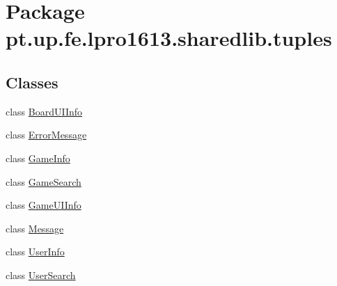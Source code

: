 \hypertarget{namespacept_1_1up_1_1fe_1_1lpro1613_1_1sharedlib_1_1tuples}{}\section{Package pt.\+up.\+fe.\+lpro1613.\+sharedlib.\+tuples}
\label{namespacept_1_1up_1_1fe_1_1lpro1613_1_1sharedlib_1_1tuples}
\subsection*{Classes}
\begin{DoxyCompactItemize}
\item 
class \hyperlink{classpt_1_1up_1_1fe_1_1lpro1613_1_1sharedlib_1_1tuples_1_1_board_u_i_info}{Board\+U\+I\+Info}
\item 
class \hyperlink{classpt_1_1up_1_1fe_1_1lpro1613_1_1sharedlib_1_1tuples_1_1_error_message}{Error\+Message}
\item 
class \hyperlink{classpt_1_1up_1_1fe_1_1lpro1613_1_1sharedlib_1_1tuples_1_1_game_info}{Game\+Info}
\item 
class \hyperlink{classpt_1_1up_1_1fe_1_1lpro1613_1_1sharedlib_1_1tuples_1_1_game_search}{Game\+Search}
\item 
class \hyperlink{classpt_1_1up_1_1fe_1_1lpro1613_1_1sharedlib_1_1tuples_1_1_game_u_i_info}{Game\+U\+I\+Info}
\item 
class \hyperlink{classpt_1_1up_1_1fe_1_1lpro1613_1_1sharedlib_1_1tuples_1_1_message}{Message}
\item 
class \hyperlink{classpt_1_1up_1_1fe_1_1lpro1613_1_1sharedlib_1_1tuples_1_1_user_info}{User\+Info}
\item 
class \hyperlink{classpt_1_1up_1_1fe_1_1lpro1613_1_1sharedlib_1_1tuples_1_1_user_search}{User\+Search}
\end{DoxyCompactItemize}
